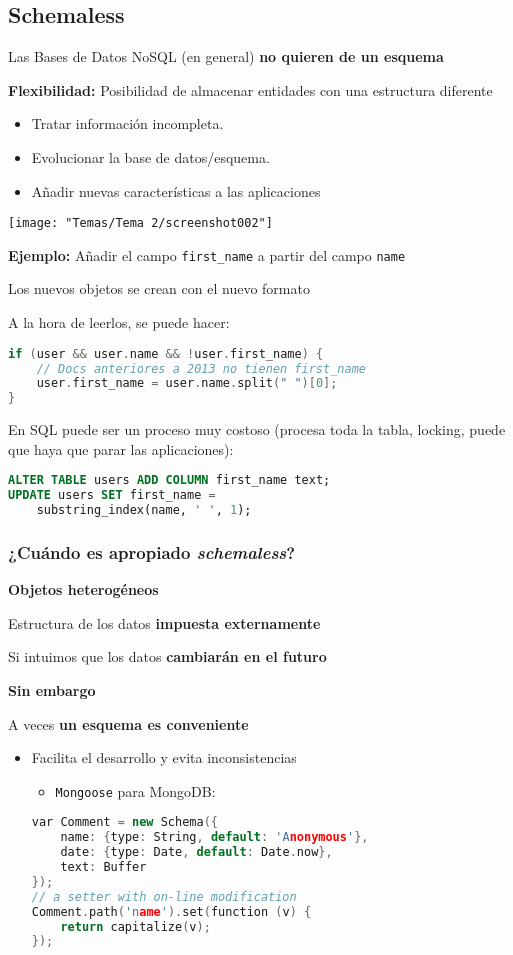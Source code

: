 \subsection{Schemaless}
Las Bases de Datos NoSQL (en general) \textbf{no quieren de un esquema}

\textbf{Flexibilidad:} Posibilidad de almacenar entidades con una estructura diferente
\begin{itemize}
	\item Tratar información incompleta.
	\item Evolucionar la base de datos/esquema.
	\item Añadir nuevas características a las aplicaciones
\end{itemize}
\begin{center}
	\texttt{[image: "Temas/Tema 2/screenshot002"]}
\end{center}
\textbf{Ejemplo:} Añadir el campo \texttt{first_name} a partir del campo \texttt{name}

Los nuevos objetos se crean con el nuevo formato

A la hora de leerlos, se puede hacer:

\begin{lstlisting}[language=c++]
if (user && user.name && !user.first_name) {
	// Docs anteriores a 2013 no tienen first_name
	user.first_name = user.name.split(" ")[0];
}
\end{lstlisting}
En SQL puede ser un proceso muy costoso (procesa toda la tabla, locking, puede que haya que parar las aplicaciones):

\begin{lstlisting}[language=SQL]
ALTER TABLE users ADD COLUMN first_name text;
UPDATE users SET first_name =
	substring_index(name, ' ', 1);
\end{lstlisting}
\subsubsection{¿Cuándo es apropiado \textit{schemaless}?}
\textbf{Objetos heterogéneos}

Estructura de los datos \textbf{impuesta externamente}

Si intuimos que los datos \textbf{cambiarán en el futuro}

\textbf{Sin embargo}

A veces \textbf{un esquema es conveniente}
\begin{itemize}
	\item Facilita el desarrollo y evita inconsistencias
	\begin{itemize}
		\item \texttt{Mongoose} para MongoDB:
	\end{itemize}
	\begin{lstlisting}[language=C++]
var Comment = new Schema({
	name: {type: String, default: 'Anonymous'},
	date: {type: Date, default: Date.now},
	text: Buffer
});
// a setter with on-line modification
Comment.path('name').set(function (v) {
	return capitalize(v);
});
	\end{lstlisting}
\end{itemize}
